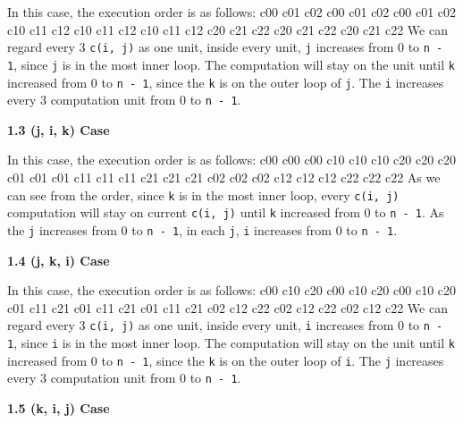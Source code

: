 \documentclass{article}%
\newenvironment{code}%
   {\snugshade\verbatim}%
   {\endverbatim\endsnugshade}
\begin{document}
\begin{Large}
In this case, the execution order is as follows:
\begin{code}
    c00 c01 c02 c00 c01 c02 c00 c01 c02 
    c10 c11 c12 c10 c11 c12 c10 c11 c12
    c20 c21 c22 c20 c21 c22 c20 c21 c22
\end{code}
We can regard every 3 \texttt{c(i, j)} as one unit, inside every unit, \texttt{j} increases from 0 to \texttt{n - 1}, since \texttt{j} is in the most inner loop. The computation will stay on the unit until \texttt{k} increased from 0 to \texttt{n - 1}, since the \texttt{k} is on the outer loop of \texttt{j}. The \texttt{i} increases every 3 computation unit from 0 to \texttt{n - 1}.
\newpage
\begin{LARGE}
\begin{flushleft}
\textbf{1.3 (j, i, k) Case}
\end{flushleft}
\end{LARGE}

In this case, the execution order is as follows:
\begin{code}
    c00 c00 c00 c10 c10 c10 c20 c20 c20 
    c01 c01 c01 c11 c11 c11 c21 c21 c21
    c02 c02 c02 c12 c12 c12 c22 c22 c22
\end{code}
As we can see from the order, since \texttt{k} is in the most inner loop, every \texttt{c(i, j)} computation will stay on current \texttt{c(i, j)} until \texttt{k} increased from 0 to \texttt{n - 1}. As the \texttt{j} increases from 0 to \texttt{n - 1}, in each \texttt{j}, \texttt{i} increases from 0 to \texttt{n - 1}.

\begin{LARGE}
\begin{flushleft}
\textbf{1.4 (j, k, i) Case}
\end{flushleft}
\end{LARGE}

In this case, the execution order is as follows:
\begin{code}
    c00 c10 c20 c00 c10 c20 c00 c10 c20 
    c01 c11 c21 c01 c11 c21 c01 c11 c21
    c02 c12 c22 c02 c12 c22 c02 c12 c22
\end{code}
We can regard every 3 \texttt{c(i, j)} as one unit, inside every unit, \texttt{i} increases from 0 to \texttt{n - 1}, since \texttt{i} is in the most inner loop. The computation will stay on the unit until \texttt{k} increased from 0 to \texttt{n - 1}, since the \texttt{k} is on the outer loop of \texttt{i}. The \texttt{j} increases every 3 computation unit from 0 to \texttt{n - 1}.
\begin{LARGE}
\begin{flushleft}
\textbf{1.5 (k, i, j) Case}
\end{flushleft}
\end{LARGE}


\end{Large}
\end{document}
